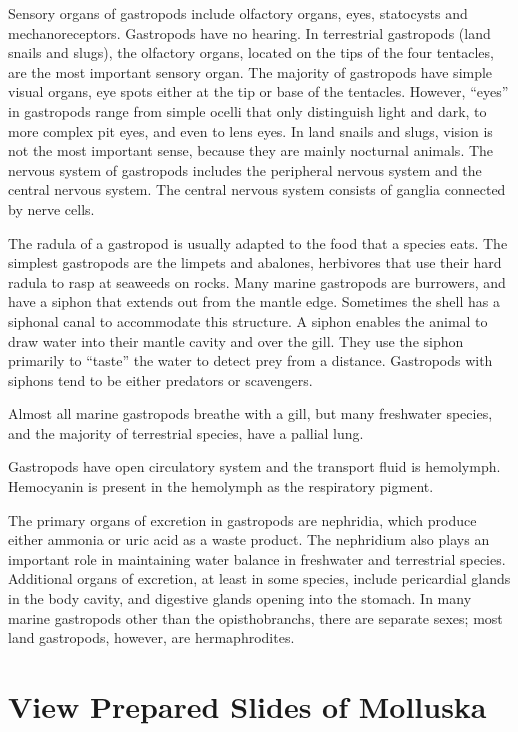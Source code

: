 \documentclass[]{book}
\begin{document}
Sensory organs of gastropods include olfactory organs, eyes, statocysts and mechanoreceptors. Gastropods have no hearing. In terrestrial gastropods (land snails and slugs), the olfactory organs, located on the tips of the four tentacles, are the most important sensory organ. The majority of gastropods have simple visual organs, eye spots either at the tip or base of the tentacles. However, ``eyes'' in gastropods range from simple ocelli that only distinguish light and dark, to more complex pit eyes, and even to lens eyes. In land snails and slugs, vision is not the most important sense, because they are mainly nocturnal animals. The nervous system of gastropods includes the peripheral nervous system and the central nervous system. The central nervous system consists of ganglia connected by nerve cells.

The radula of a gastropod is usually adapted to the food that a species eats. The simplest gastropods are the limpets and abalones, herbivores that use their hard radula to rasp at seaweeds on rocks. Many marine gastropods are burrowers, and have a siphon that extends out from the mantle edge. Sometimes the shell has a siphonal canal to accommodate this structure. A siphon enables the animal to draw water into their mantle cavity and over the gill. They use the siphon primarily to ``taste'' the water to detect prey from a distance. Gastropods with siphons tend to be either predators or scavengers.

Almost all marine gastropods breathe with a gill, but many freshwater species, and the majority of terrestrial species, have a pallial lung.

Gastropods have open circulatory system and the transport fluid is hemolymph. Hemocyanin is present in the hemolymph as the respiratory pigment.

The primary organs of excretion in gastropods are nephridia, which produce either ammonia or uric acid as a waste product. The nephridium also plays an important role in maintaining water balance in freshwater and terrestrial species. Additional organs of excretion, at least in some species, include pericardial glands in the body cavity, and digestive glands opening into the stomach.
In many marine gastropods other than the opisthobranchs, there are separate sexes; most land gastropods, however, are hermaphrodites.

\hypertarget{view-prepared-slides-of-molluska}{%
\section{View Prepared Slides of Molluska}\label{view-prepared-slides-of-molluska}}
\end{document}
